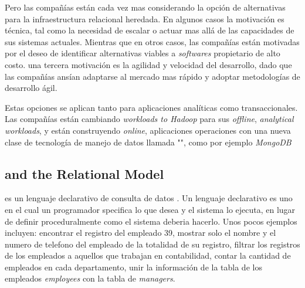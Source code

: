 Pero las compañías están cada vez mas considerando la opción de alternativas para la infraestructura relacional heredada. En algunos casos la motivación es técnica, tal como la necesidad de escalar o actuar mas allá de las capacidades de sus sistemas actuales. Mientras que en otros casos, las compañías están motivadas por el deseo de identificar alternativas viables a \textit{softwares} propietario de alto costo. una tercera motivación es la agilidad y velocidad del desarrollo, dado que las compañías ansían adaptarse al mercado mas rápido y adoptar metodologías de desarrollo ágil.

Estas opciones se aplican tanto para aplicaciones analíticas como transaccionales. Las compañías están cambiando \textit{workloads to Hadoop} para sus \textit{offline}, \textit{analytical workloads}, y están construyendo \textit{online}, aplicaciones operaciones con una nueva clase de tecnología de manejo de datos llamada "", como por ejemplo \textit{MongoDB}

\subsection{ and the Relational Model}

 es un lenguaje declarativo de consulta de datos . Un lenguaje declarativo es uno en el cual un programador specifica lo que desea y el sistema lo ejecuta, en lugar de definir proceduralmente como el sistema deberia hacerlo. Unos pocos ejemplos incluyen: encontrar el registro del empleado 39, mostrar solo el nombre y el numero de telefono del empleado de la totalidad de su registro, filtrar los registros de los empleados a aquellos que trabajan en contabilidad, contar la cantidad de empleados en cada departamento, unir la información de la tabla de los empleados \textit{employees} con la tabla de \textit{managers}.


